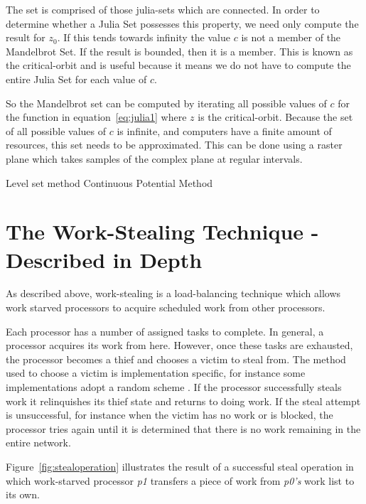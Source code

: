 The set is comprised of those \glspl{julia-set} which are connected. In order to determine whether a Julia Set possesses this property,
we need only compute the result for \(z_0\). If this tends towards infinity the value \(c\) is not a member of the Mandelbrot Set. If the result
is bounded, then it is a member. This is known as the \gls{critical-orbit} and is useful because it means we do not have to compute
the entire Julia Set for each value of \(c\).

So the Mandelbrot set can be computed by iterating all possible values of \(c\) for the function in equation~\ref{eq:julia1} where \(z\) is the 
\gls{critical-orbit}. Because the set of all possible values of \(c\) is infinite, and computers have a finite amount of resources, this 
set needs to be approximated. This can be done using a raster plane which takes samples of the complex plane at regular intervals. 

Level set method \cite[p.~188]{fractimg} Continuous Potential Method \cite[p.~191]{fractimg}

\section{The Work-Stealing Technique - Described in Depth}

As described above, \gls{work-stealing} is a \gls{load-balancing} technique which allows work starved processors to acquire scheduled work from other processors. 

Each processor has a number of assigned tasks to complete. In general, a processor acquires its work from here.
However, once these tasks are exhausted, the processor becomes a \gls{thief} and chooses a \gls{victim} to steal from. 
The method used to choose a victim is implementation specific, for instance some implementations adopt a random scheme \cite{blumleis , jliff, narora}.
If the processor successfully steals work it relinquishes its thief state and returns to doing work.
If the steal attempt is unsuccessful, for instance when the victim has no work or is blocked, the processor tries again
until it is determined that there is no work remaining in the entire network. 

Figure~\ref{fig:stealoperation} illustrates the result of a successful steal operation in which work-starved processor \textit{p1} transfers a piece
of work from \textit{p0's} work list to its own. %

